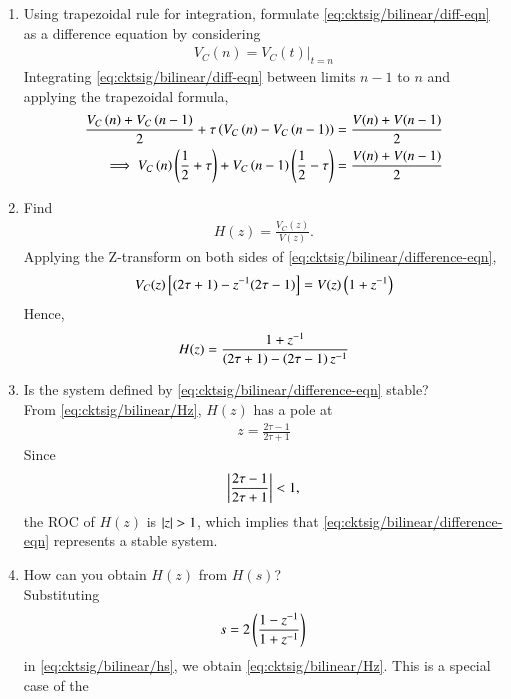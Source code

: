 \documentclass[journal,12pt,twocolumn]{IEEEtran}
\renewcommand\thesection{\arabic{section}}
\begin{document}
\begin{enumerate}[label=\arabic*.,ref=\thesection.\theenumi]
\fi
\item Using trapezoidal rule for integration, formulate 
    \eqref{eq:cktsig/bilinear/diff-eqn}
as a
difference
equation by considering 
\begin{align}
	V_C(n) = V_C(t)\vert_{t=n}
\end{align}
\solution Integrating \eqref{eq:cktsig/bilinear/diff-eqn} between limits $n-1$ to $n$ 
and applying the trapezoidal formula,
\begin{align}
    \frac{V_C\brak{n} + V_C\brak{n-1}}{2} + \tau\brak{V_C\brak{n}-V_C\brak{n-1}} 
    = \frac{V(n)+V(n-1)}{2}
    \\
	\implies 
	V_C\brak{n} \brak{\frac{ 1}{2}+ \tau } + V_C\brak{n-1}\brak{\frac{ 1}{2}- \tau} 
    = \frac{V(n)+V(n-1)}{2}
    \label{eq:cktsig/bilinear/difference-eqn}
\end{align}
\item Find 
\begin{align}
H(z) =  \frac{V_C(z)}{V(z)}.
\end{align}
\solution Applying the Z-transform on both sides of \eqref{eq:cktsig/bilinear/difference-eqn},
\begin{align}
    V_C(z){}\left[(2\tau + 1) - z^{-1}(2\tau - 1)\right] = V(z)\left(1 + z^{-1}\right)
\end{align}
Hence,
\begin{align}
    H(z) = \frac{1+z^{-1}}{\brak{2\tau+1}-\brak{2\tau-1}z^{-1}}
    \label{eq:cktsig/bilinear/Hz}
\end{align}
\item Is the system defined by 
    \eqref{eq:cktsig/bilinear/difference-eqn} stable?
    \\
    \solution 
From     \eqref{eq:cktsig/bilinear/Hz}, 
$H(z)$ has a pole at 
\begin{align}
z =\frac{2\tau-1}{2\tau+1} 
\end{align}
Since 
\begin{align}
\left\vert\frac{2\tau-1}{2\tau+1}\right\vert < 1,
\end{align}
the ROC of $H(z)$ is $\left\vert z\right\vert > 1$, which implies that \eqref{eq:cktsig/bilinear/difference-eqn} represents a stable system.
\item How can you obtain $H(z)$ from $H(s)$?
\\
\solution Substituting
\begin{align}
	s =2\left(\frac{1 - z^{-1}}{1 + z^{-1}}\right)
\end{align}
in
    \eqref{eq:cktsig/bilinear/hs},
    we obtain 
    \eqref{eq:cktsig/bilinear/Hz}. This is a special case of the 

\end{enumerate}
\end{document}
